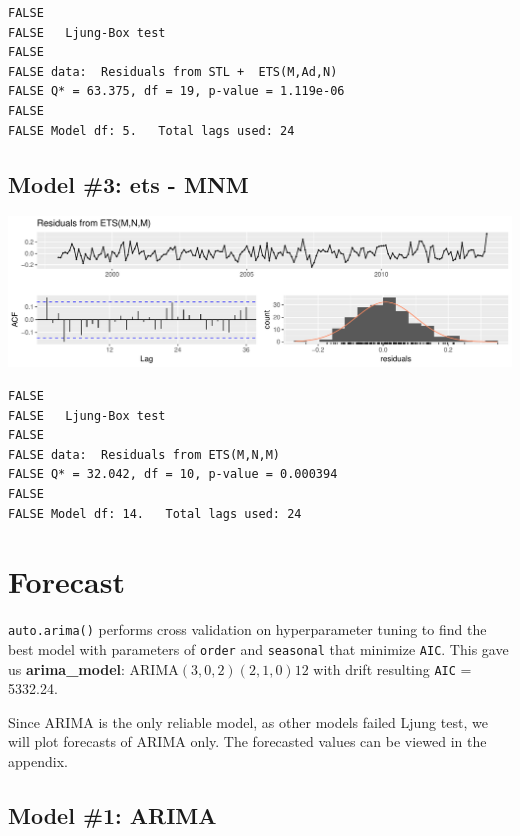 \documentclass[openany]{book}
\begin{document}
\begin{verbatim}
FALSE 
FALSE   Ljung-Box test
FALSE 
FALSE data:  Residuals from STL +  ETS(M,Ad,N)
FALSE Q* = 63.375, df = 19, p-value = 1.119e-06
FALSE 
FALSE Model df: 5.   Total lags used: 24
\end{verbatim}

\hypertarget{model-3-ets---mnm}{%
\subsection{Model \#3: ets - MNM}\label{model-3-ets---mnm}}

\includegraphics{Part-B-AS_files/figure-latex/unnamed-chunk-7-1.pdf}

\begin{verbatim}
FALSE 
FALSE   Ljung-Box test
FALSE 
FALSE data:  Residuals from ETS(M,N,M)
FALSE Q* = 32.042, df = 10, p-value = 0.000394
FALSE 
FALSE Model df: 14.   Total lags used: 24
\end{verbatim}

\hypertarget{b-forecast}{%
\section*{Forecast}\label{b-forecast}}

\texttt{auto.arima()} performs cross validation on hyperparameter tuning
to find the best model with parameters of \texttt{order} and
\texttt{seasonal} that minimize \texttt{AIC}. This gave us
\textbf{arima\_model}: ARIMA\((3,0,2)(2,1,0)12\) with drift resulting
\texttt{AIC} = 5332.24.

Since ARIMA is the only reliable model, as other models failed Ljung
test, we will plot forecasts of ARIMA only. The forecasted values can be
viewed in the appendix.

\hypertarget{model-1-arima-1}{%
\subsection{Model \#1: ARIMA}\label{model-1-arima-1}}
\end{document}
